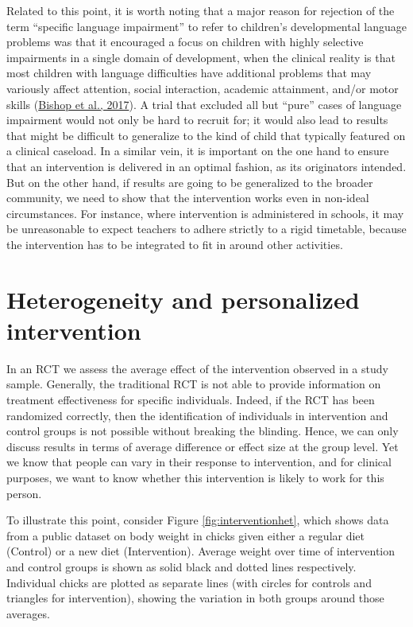 \documentclass{krantz}
\begin{document}
Related to this point, it is worth noting that a major reason for rejection of the term ``specific language impairment'' to refer to children's developmental language problems was that it encouraged a focus on children with highly selective impairments in a single domain of development, when the clinical reality is that most children with language difficulties have additional problems that may variously affect attention, social interaction, academic attainment, and/or motor skills (\protect\hyperlink{ref-bishop2017}{Bishop et al., 2017}). A trial that excluded all but ``pure'' cases of language impairment would not only be hard to recruit for; it would also lead to results that might be difficult to generalize to the kind of child that typically featured on a clinical caseload. In a similar vein, it is important on the one hand to ensure that an intervention is delivered in an optimal fashion, as its originators intended. But on the other hand, if results are going to be generalized to the broader community, we need to show that the intervention works even in non-ideal circumstances. For instance, where intervention is administered in schools, it may be unreasonable to expect teachers to adhere strictly to a rigid timetable, because the intervention has to be integrated to fit in around other activities.

\hypertarget{heterogeneity-and-personalized-intervention}{%
\section{Heterogeneity and personalized intervention}\label{heterogeneity-and-personalized-intervention}}

In an RCT we assess the average effect of the intervention observed in a study sample. Generally, the traditional RCT is not able to provide information on treatment effectiveness for specific individuals. Indeed, if the RCT has been randomized correctly, then the identification of individuals in intervention and control groups is not possible without breaking the blinding. Hence, we can only discuss results in terms of average difference or effect size at the group level. Yet we know that people can vary in their response to intervention, and for clinical purposes, we want to know whether this intervention is likely to work for this person.

To illustrate this point, consider Figure \ref{fig:interventionhet}, which shows data from a public dataset on body weight in chicks given either a regular diet (Control) or a new diet (Intervention). Average weight over time of intervention and control groups is shown as solid black and dotted lines respectively. Individual chicks are plotted as separate lines (with circles for controls and triangles for intervention), showing the variation in both groups around those averages.
\end{document}

